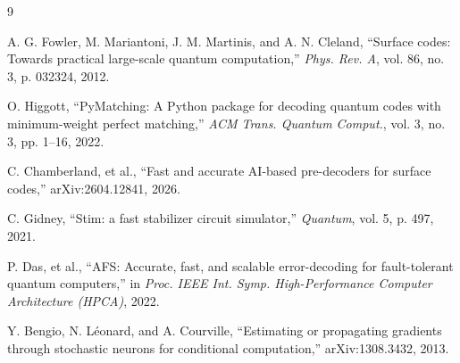 \documentclass[conference]{IEEEtran}
\begin{document}
\begin{thebibliography}{9}

A. G. Fowler, M. Mariantoni, J. M. Martinis, and A. N. Cleland, ``Surface codes: Towards practical large-scale quantum computation,'' \emph{Phys. Rev. A}, vol. 86, no. 3, p. 032324, 2012.

O. Higgott, ``PyMatching: A Python package for decoding quantum codes with minimum-weight perfect matching,'' \emph{ACM Trans. Quantum Comput.}, vol. 3, no. 3, pp. 1--16, 2022.

C. Chamberland, et al., ``Fast and accurate AI-based pre-decoders for surface codes,'' arXiv:2604.12841, 2026.

C. Gidney, ``Stim: a fast stabilizer circuit simulator,'' \emph{Quantum}, vol. 5, p. 497, 2021.

P. Das, et al., ``AFS: Accurate, fast, and scalable error-decoding for fault-tolerant quantum computers,'' in \emph{Proc. IEEE Int. Symp. High-Performance Computer Architecture (HPCA)}, 2022.

Y. Bengio, N. L\'{e}onard, and A. Courville, ``Estimating or propagating gradients through stochastic neurons for conditional computation,'' arXiv:1308.3432, 2013.

\end{thebibliography}
\end{document}
